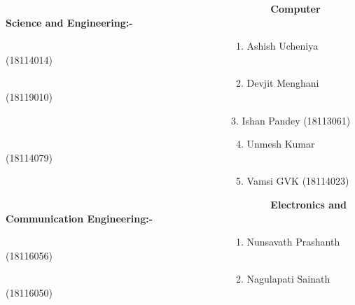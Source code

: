 \documentclass[12pt]{article}
\begin{document}
{\fontsize{15pt}{18.0pt}\selectfont \textbf{\ \ \ \ \ \ \ \ \ \ \ \ \ \ \ \ \ \ \ \ \ \ \ \ \ \ \ \ \ \ \ \ \ \ \ \ \ \ \ \ \ \ \ \ \ \ \  Computer Science and Engineering:-}\par}\par

{\fontsize{15pt}{18.0pt}\selectfont \ \ \ \ \ \ \ \ \ \ \ \ \ \ \ \ \ \ \ \ \ \ \ \ \ \ \ \ \ \ \ \ \ \ \ \ \ \ \ \ \ \ \ \ \ \ \  1. Ashish Ucheniya (18114014)\par}\par

{\fontsize{15pt}{18.0pt}\selectfont \ \ \ \ \ \ \ \ \ \ \ \ \ \ \ \ \ \ \ \ \ \ \ \ \ \ \ \ \ \ \ \ \ \ \ \ \ \ \ \ \ \ \ \ \ \ \  2. Devjit Menghani (18119010)\par}\par

{\fontsize{15pt}{18.0pt}\selectfont \ \ \ \ \ \ \ \ \ \ \ \ \ \ \ \ \ \ \ \ \ \ \ \ \ \ \ \ \ \ \  \ \ \ \ \ \ \ \ \ \ \ \ \ \ \  3. Ishan Pandey (18113061)\par}\par

{\fontsize{15pt}{18.0pt}\selectfont \ \ \ \ \ \ \ \ \ \ \ \ \ \ \ \ \ \ \ \ \ \ \ \ \ \ \ \ \ \ \ \ \ \ \ \ \ \ \ \ \ \ \ \ \ \ \  4. Unmesh Kumar (18114079)\par}\par

{\fontsize{15pt}{18.0pt}\selectfont \ \ \ \ \ \ \ \ \ \ \ \ \ \ \ \ \ \ \ \ \ \ \ \ \ \ \ \ \ \ \ \ \ \ \ \ \ \ \ \ \ \ \ \ \ \ \  5. Vamsi GVK (18114023)\par}\par


\vspace{\baselineskip}
{\fontsize{15pt}{18.0pt}\selectfont \textbf{\ \ \ \ \ \ \ \ \ \ \ \ \ \ \ \ \ \ \ \ \ \ \ \ \ \ \ \ \ \ \ \ \ \ \ \ \ \ \ \ \ \ \ \ \ \ \  Electronics and Communication Engineering:-}\par}\par

{\fontsize{15pt}{18.0pt}\selectfont \ \ \ \ \ \ \ \ \ \ \ \ \ \ \ \ \ \ \ \ \ \ \ \ \ \ \ \ \ \ \ \ \ \ \ \ \ \ \ \ \ \ \ \ \ \ \  1. Nunsavath Prashanth (18116056)\par}\par

{\fontsize{15pt}{18.0pt}\selectfont \ \ \ \ \ \ \ \ \ \ \ \ \ \ \ \ \ \ \ \ \ \ \ \ \ \ \ \ \ \ \ \ \ \ \ \ \ \ \ \ \ \ \ \ \ \ \  2. Nagulapati Sainath (18116050)\par}\par
\end{document}
